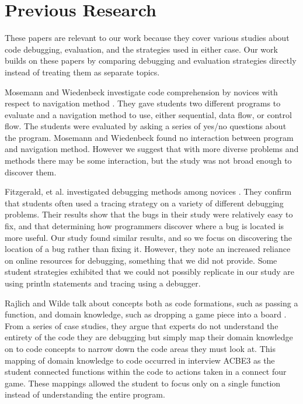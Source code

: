 \section{Previous Research}

These papers are relevant to our work because they cover various studies about code debugging, evaluation, and the strategies used in either case. Our work builds on these papers by comparing debugging and evaluation strategies directly instead of treating them as separate topics.


Mosemann and Wiedenbeck investigate code comprehension by novices with respect to navigation method \cite{mosemann2001}.
They gave students two different programs to evaluate and a navigation method to use, either sequential, data flow, or control flow.
The students were evaluated by asking a series of yes/no questions about the program.
Mosemann and Wiedenbeck found no interaction between program and navigation method.
However we suggest that with more diverse problems and methods there may be some interaction, but the study was not broad enough to discover them.

Fitzgerald, et al. investigated debugging methods among novices \cite{fitzgerald2008}.
They confirm that students often used a tracing strategy on a variety of different debugging problems.
Their results show that the bugs in their study were relatively easy to fix, and that determining how programmers discover where a bug is located is more useful.
Our study found similar results, and so we focus on discovering the location of a bug rather than fixing it.
However, they note an increased reliance on online resources for debugging, something that we did not provide.
Some student strategies exhibited that we could not possibly replicate in our study are using println statements and tracing using a debugger.

Rajlich and Wilde talk about concepts both as code formations, such as passing a function, and domain knowledge, such as dropping a game piece into a board \cite{1021348}.
From a series of case studies, they argue that experts do not understand the entirety of the code they are debugging but simply map their domain knowledge on to code concepts to narrow down the code areas they must look at.
This mapping of domain knowledge to code occurred in interview ACBE3 as the student connected functions within the code to actions taken in a connect four game.
These mappings allowed the student to focus only on a single function instead of understanding the entire program.

